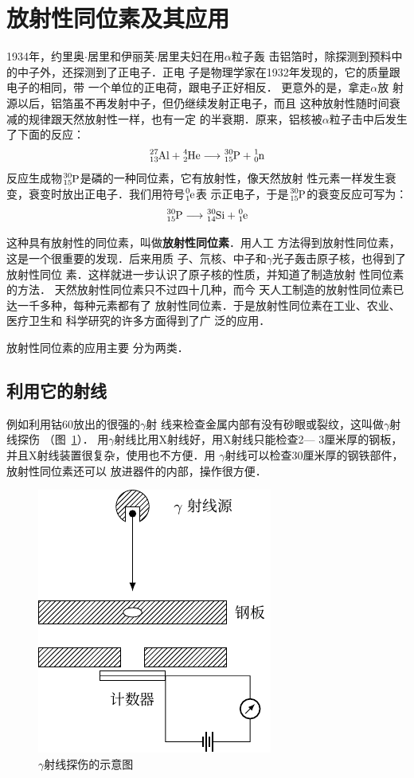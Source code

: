 \section{放射性同位素及其应用}
1934年，约里奥$\cdot$居里和伊丽芙$\cdot$居里夫妇在用$\alpha$粒子轰
击铝箔时，除探测到预料中的中子外，还探测到了正电子．正电
子是物理学家在1932年发现的，它的质量跟电子的相同，带
一个单位的正电荷，跟电子正好相反．
更意外的是，拿走$\alpha$放
射源以后，铝箔虽不再发射中子，但仍继续发射正电子，而且
这种放射性随时间衰减的规律跟天然放射性一样，也有一定
的半衰期．原来，铝核被$\alpha$粒子击中后发生了下面的反应：
\[\atom{Al}{27}{13}+\atom{He}{4}{2}\longrightarrow\atom{P}{30}{15}+\atom{n}{1}{0}  \]
反应生成物$\atom{P}{30}{15}$是磷的一种同位素，它有放射性，像天然放射
性元素一样发生衰变，衰变时放出正电子．我们用符号$\atom{e}{0}{1}$表
示正电子，于是$\atom{P}{30}{15}$的衰变反应可写为：
\[\atom{P}{30}{15}\longrightarrow \atom{Si}{30}{14}+\atom{e}{0}{1} \]

这种具有放射性的同位素，叫做\textbf{放射性同位素}．用人工
方法得到放射性同位素，这是一个很重要的发现．后来用质
子、氘核、中子和$\gamma$光子轰击原子核，也得到了放射性同位
素．这样就进一步认识了原子核的性质，并知道了制造放射
性同位素的方法．
天然放射性同位素只不过四十几种，而今
天人工制造的放射性同位素已
达一千多种，每种元素都有了
放射性同位素．于是放射性同位素在工业、农业、医疗卫生和
科学研究的许多方面得到了广
泛的应用．

放射性同位素的应用主要
分为两类．

\subsection{利用它的射线}

例如利用钴60放出的很强的$\gamma$射
线来检查金属内部有没有砂眼或裂纹，这叫做$\gamma$射线探伤
（图~\ref{fig_C_9-9}）．
用$\gamma$射线比用X射线好，用X射线只能检查2—
3厘米厚的钢板，并且X射线装置很复杂，使用也不方便．用
$\gamma$射线可以检查30厘米厚的钢铁部件，放射性同位素还可以
放进器件的内部，操作很方便．
\begin{figure}[htbp]
    \centering
    \includegraphics{fig/C/9-9.pdf}
    \caption{$\gamma$射线探伤的示意图}\label{fig_C_9-9}
\end{figure}


